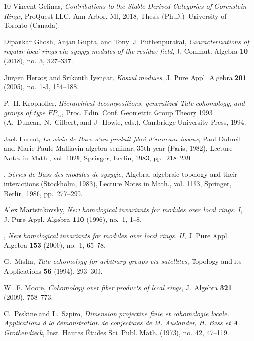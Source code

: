 \documentclass{amsart}
\numberwithin{equation}{section}
\theoremstyle{plain}
\theoremstyle{definition}
\theoremstyle{remark}
\begin{document}
\begin{thebibliography}{10}
Vincent Gelinas, \emph{Contributions to the {S}table {D}erived {C}ategories of
  {G}orenstein {R}ings}, ProQuest LLC, Ann Arbor, MI, 2018, Thesis
  (Ph.D.)--University of Toronto (Canada). 

Dipankar Ghosh, Anjan Gupta, and Tony~J. Puthenpurakal, \emph{Characterizations
  of regular local rings via syzygy modules of the residue field}, J. Commut.
  Algebra \textbf{10} (2018), no.~3, 327--337. 

J\"{u}rgen Herzog and Srikanth Iyengar, \emph{Koszul modules}, J. Pure Appl.
  Algebra \textbf{201} (2005), no.~1-3, 154--188. 

P.~H. Kropholler, \emph{{Hierarchical decompositions, generalized Tate
  cohomology, and groups of type $FP_\infty$}}, Proc. Edin. Conf. Geometric
  Group Theory 1993 (A.~Duncan, N.~Gilbert, and J.~Howie, eds.), Cambridge
  University Press, 1994.

Jack Lescot, \emph{La s\'erie de {B}ass d'un produit fibr\'e{} d'anneaux
  locaux}, Paul {D}ubreil and {M}arie-{P}aule {M}alliavin algebra seminar, 35th
  year ({P}aris, 1982), Lecture Notes in Math., vol. 1029, Springer, Berlin,
  1983, pp.~218--239. 

\bysame, \emph{S\'eries de {B}ass des modules de syzygie}, Algebra, algebraic
  topology and their interactions ({S}tockholm, 1983), Lecture Notes in Math.,
  vol. 1183, Springer, Berlin, 1986, pp.~277--290. 

Alex Martsinkovsky, \emph{New homological invariants for modules over local
  rings. {I}}, J. Pure Appl. Algebra \textbf{110} (1996), no.~1, 1--8.

\bysame, \emph{New homological invariants for modules over local rings. {II}},
  J. Pure Appl. Algebra \textbf{153} (2000), no.~1, 65--78. 

G.~Mislin, \emph{{Tate cohomology for arbitrary groups via satellites}},
  Topology and its Applications \textbf{56} (1994), 293--300.

W.~F. Moore, \emph{{Cohomology over fiber products of local rings}}, J.~Algebra
  \textbf{321} (2009), 758--773.

C.~Peskine and L.~Szpiro, \emph{Dimension projective finie et cohomologie
  locale. {A}pplications \`a{} la d\'emonstration de conjectures de {M}.
  {A}uslander, {H}. {B}ass et {A}. {G}rothendieck}, Inst. Hautes \'Etudes Sci.
  Publ. Math. (1973), no.~42, 47--119. 


\end{thebibliography}
\end{document}
